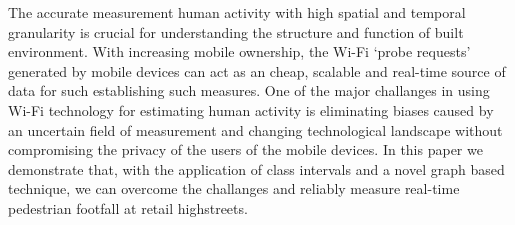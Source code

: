 The accurate measurement human activity with high spatial and temporal granularity is crucial for understanding the structure and function of built environment.
With increasing mobile ownership, the Wi-Fi `probe requests' generated by mobile devices can act as an cheap, scalable and real-time source of data for such establishing such measures.
One of the major challanges in using Wi-Fi technology for estimating human activity is eliminating biases caused by an uncertain field of measurement and changing technological landscape without compromising the privacy of the users of the mobile devices.
In this paper we demonstrate that, with the application of class intervals and a novel graph based technique, we can overcome the challanges and reliably measure real-time pedestrian footfall at retail highstreets.
